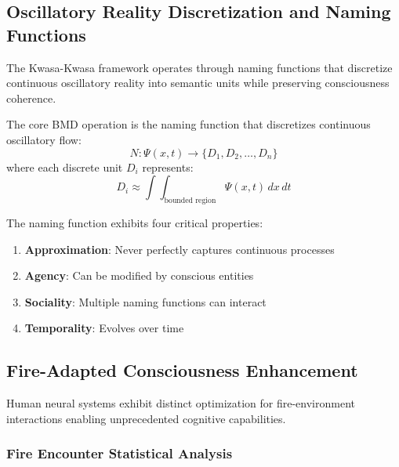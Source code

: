 ﻿\documentclass[11pt,a4paper]{article}
\begin{document}
\subsection{Oscillatory Reality Discretization and Naming Functions}

The Kwasa-Kwasa framework operates through naming functions that discretize continuous oscillatory reality into semantic units while preserving consciousness coherence.

\begin{definition}
The core BMD operation is the naming function that discretizes continuous oscillatory flow:
\begin{equation}
N: \Psi(x,t) \rightarrow \{D_1, D_2, \ldots, D_n\}
\end{equation}
where each discrete unit $D_i$ represents:
\begin{equation}
D_i \approx \int\int_{\text{bounded region}} \Psi(x,t) \, dx \, dt
\end{equation}
\end{definition}

The naming function exhibits four critical properties:
\begin{enumerate}
\item \textbf{Approximation}: Never perfectly captures continuous processes
\item \textbf{Agency}: Can be modified by conscious entities
\item \textbf{Sociality}: Multiple naming functions can interact
\item \textbf{Temporality}: Evolves over time
\end{enumerate}

\subsection{Fire-Adapted Consciousness Enhancement}

Human neural systems exhibit distinct optimization for fire-environment interactions enabling unprecedented cognitive capabilities.

\subsubsection{Fire Encounter Statistical Analysis}
\end{document}
